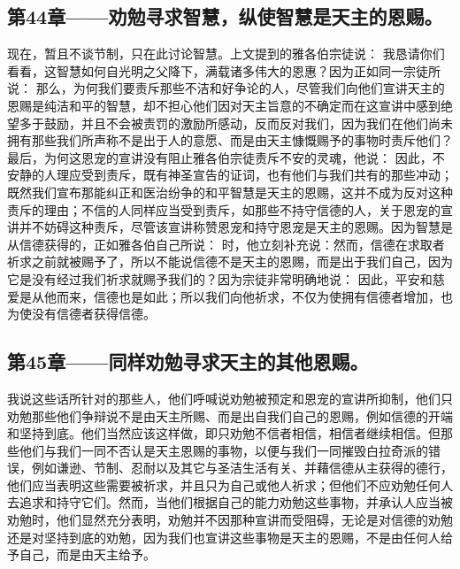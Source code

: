 
\subsection{第44章——劝勉寻求智慧，纵使智慧是天主的恩赐。}

现在，暂且不谈节制，只在此讨论智慧。上文提到的雅各伯宗徒说： 我恳请你们看看，这智慧如何自光明之父降下，满载诸多伟大的恩惠？因为正如同一宗徒所说： 那么，为何我们要责斥那些不洁和好争论的人，尽管我们向他们宣讲天主的恩赐是纯洁和平的智慧，却不担心他们因对天主旨意的不确定而在这宣讲中感到绝望多于鼓励，并且不会被责罚的激励所感动，反而反对我们，因为我们在他们尚未拥有那些我们所声称不是出于人的意愿、而是由天主慷慨赐予的事物时责斥他们？最后，为何这恩宠的宣讲没有阻止雅各伯宗徒责斥不安的灵魂，他说： 因此，不安静的人理应受到责斥，既有神圣宣告的证词，也有他们与我们共有的那些冲动；既然我们宣布那能纠正和医治纷争的和平智慧是天主的恩赐，这并不成为反对这种责斥的理由；不信的人同样应当受到责斥，如那些不持守信德的人，关于恩宠的宣讲并不妨碍这种责斥，尽管该宣讲称赞恩宠和持守恩宠是天主的恩赐。因为智慧是从信德获得的，正如雅各伯自己所说： 时，他立刻补充说：然而，信德在求取者祈求之前就被赐予了，所以不能说信德不是天主的恩赐，而是出于我们自己，因为它是没有经过我们祈求就赐予我们的？因为宗徒非常明确地说： 因此，平安和慈爱是从他而来，信德也是如此；所以我们向他祈求，不仅为使拥有信德者增加，也为使没有信德者获得信德。\par


\subsection{第45章——同样劝勉寻求天主的其他恩赐。}

我说这些话所针对的那些人，他们呼喊说劝勉被预定和恩宠的宣讲所抑制，他们只劝勉那些他们争辩说不是由天主所赐、而是出自我们自己的恩赐，例如信德的开端和坚持到底。他们当然应该这样做，即只劝勉不信者相信，相信者继续相信。但那些他们与我们一同不否认是天主恩赐的事物，以便与我们一同摧毁白拉奇派的错误，例如谦逊、节制、忍耐以及其它与圣洁生活有关、并藉信德从主获得的德行，他们应当表明这些需要被祈求，并且只为自己或他人祈求；但他们不应劝勉任何人去追求和持守它们。然而，当他们根据自己的能力劝勉这些事物，并承认人应当被劝勉时，他们显然充分表明，劝勉并不因那种宣讲而受阻碍，无论是对信德的劝勉还是对坚持到底的劝勉，因为我们也宣讲这些事物是天主的恩赐，不是由任何人给予自己，而是由天主给予。\par

